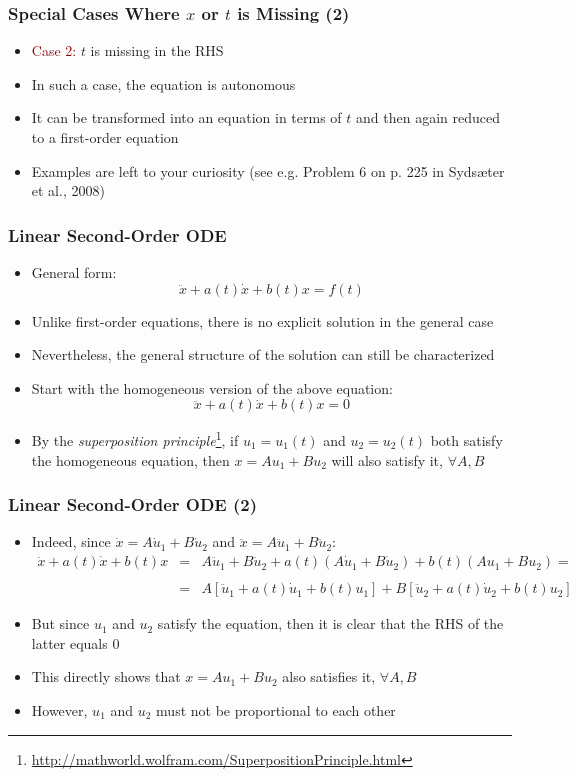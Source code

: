 \documentclass[10pt,usenames,dvipsnames]{beamer}
\theoremstyle{definition}
\begin{document}
\begin{frame}[fragile]
\frametitle{Special Cases Where $x$ or $t$ is Missing (2)}
\begin{itemize}
	\item \textcolor{darkred}{Case 2:} $t$ is missing in the RHS
	\item In such a case, the equation is autonomous
	\item It can be transformed into an equation in terms of $t$ and then again reduced to a first-order equation
	\item Examples are left to your curiosity (see e.g. Problem 6 on p. 225 in Syds{\ae}ter et al., 2008)
\end{itemize}
\end{frame}

\begin{frame}[fragile]
\frametitle{Linear Second-Order ODE}
\begin{itemize}
	\item General form:
	\[
		\ddot{x} + a(t)\dot{x} + b(t)x = f(t)
	\]
	\item Unlike first-order equations, there is no explicit solution in the general case
	\item Nevertheless, the general structure of the solution can still be characterized
	\item Start with the homogeneous version of the above equation:
	\[
		\ddot{x} + a(t)\dot{x} + b(t)x = 0
	\]
	\item By the \textit{superposition principle}\footnote{\url{http://mathworld.wolfram.com/SuperpositionPrinciple.html}}, if $u_{1} = u_{1}(t)$ and $u_{2} = u_{2}(t)$ both satisfy the homogeneous equation, then $x = Au_{1} + Bu_{2}$ will also satisfy it, $\forall A,B$
\end{itemize}
\end{frame}

\begin{frame}[fragile]
\frametitle{Linear Second-Order ODE (2)}
\begin{itemize}
	\item Indeed, since $\dot{x} = A\dot{u}_{1} + B\dot{u}_{2}$ and $\ddot{x} = A\ddot{u}_{1} + B\ddot{u}_{2}$:
	\[
		\begin{array}{lcl}
			\ddot{x} + a(t)\dot{x} + b(t)x & = & A\ddot{u}_{1} + B\ddot{u}_{2} + a(t)(A\dot{u}_{1} + B\dot{u}_{2}) + b(t)(Au_{1} + Bu_{2}) = \\
			\quad\\
			& = & A[\ddot{u}_{1} + a(t)\dot{u}_{1} + b(t)u_{1}] + B[\ddot{u}_{2} + a(t)\dot{u}_{2} + b(t)u_{2}]
		\end{array}
	\]
	\item But since $u_{1}$ and $u_{2}$ satisfy the equation, then it is clear that the RHS of the latter equals 0
	\item This directly shows that $x = Au_{1} + Bu_{2}$ also satisfies it, $\forall A,B$
	\item However, $u_{1}$ and $u_{2}$ must not be proportional to each other
\end{itemize}
\end{frame}
\end{document}
